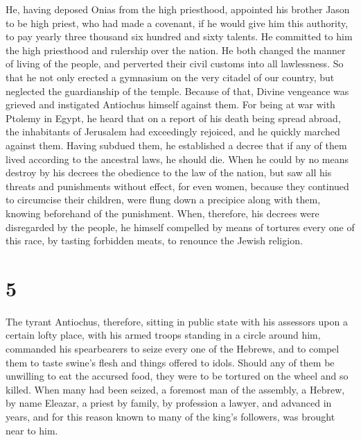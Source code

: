  He, having deposed Onias from the high priesthood,
appointed his brother Jason to be high priest,  who had
made a covenant, if he would give him this authority, to pay yearly
three thousand six hundred and sixty talents.  He
committed to him the high priesthood and rulership over the nation.
 He both changed the manner of living of the people, and
perverted their civil customs into all lawlessness.  So
that he not only erected a gymnasium on the very citadel of our country,
but neglected the guardianship of the temple.  Because of
that, Divine vengeance was grieved and instigated Antiochus himself
against them.  For being at war with Ptolemy in Egypt, he
heard that on a report of his death being spread abroad, the inhabitants
of Jerusalem had exceedingly rejoiced, and he quickly marched against
them.  Having subdued them, he established a decree that
if any of them lived according to the ancestral laws, he should die.
 When he could by no means destroy by his decrees the
obedience to the law of the nation, but saw all his threats and
punishments without effect,  for even women, because they
continued to circumcise their children, were flung down a precipice
along with them, knowing beforehand of the punishment. 
When, therefore, his decrees were disregarded by the people, he himself
compelled by means of tortures every one of this race, by tasting
forbidden meats, to renounce the Jewish religion.

\hypertarget{section-4}{%
\section{5}\label{section-4}}

 The tyrant Antiochus, therefore, sitting in public state
with his assessors upon a certain lofty place, with his armed troops
standing in a circle around him,  commanded his
spearbearers to seize every one of the Hebrews, and to compel them to
taste swine's flesh and things offered to idols.  Should
any of them be unwilling to eat the accursed food, they were to be
tortured on the wheel and so killed.  When many had been
seized, a foremost man of the assembly, a Hebrew, by name Eleazar, a
priest by family, by profession a lawyer, and advanced in years, and for
this reason known to many of the king's followers, was brought near to
him.

